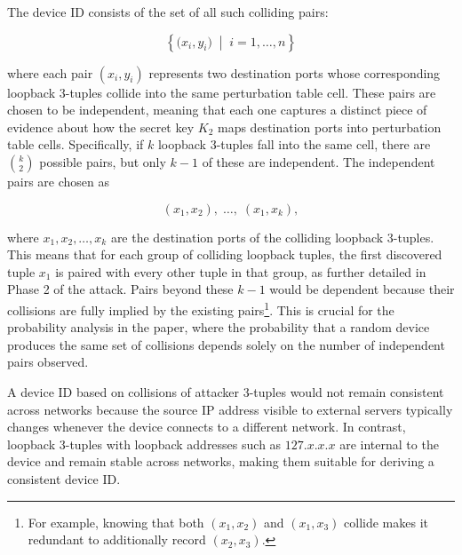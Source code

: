 \documentclass{report}
\begin{document}
The device ID consists of the set of all such colliding pairs:

\[
	\left\{ \bigl(x_i, y_i\bigr) \;\middle|\; i = 1, \ldots, n \right\}
\]

where each pair $(x_i, y_i)$ represents \alert{two destination ports} whose corresponding loopback 3-tuples collide into the same perturbation table cell. These pairs are chosen to be \alert{independent}, meaning that each one captures a distinct piece of evidence about how the secret key $K_2$ maps destination ports into perturbation table cells. Specifically, if $k$ loopback 3-tuples fall into the same cell, there are $\binom{k}{2}$ possible pairs, but only $k-1$ of these are independent. The independent pairs are chosen as

\[
	(x_1, x_2),\; \ldots,\; (x_1, x_k),
\]

where $x_1, x_2, \ldots, x_k$ are the destination ports of the colliding loopback 3-tuples. This means that for each group of colliding loopback tuples, the first discovered tuple $x_1$ is paired with every other tuple in that group, as further detailed in Phase 2 of the attack. Pairs beyond these $k-1$ would be \alert{dependent} because their collisions are fully implied by the existing pairs\footnote{For example, knowing that both $(x_1, x_2)$ and $(x_1, x_3)$ collide makes it redundant to additionally record $(x_2, x_3)$.}. This is crucial for the probability analysis in the paper, where the probability that a random device produces the same set of collisions depends solely on the number of independent pairs observed.

A device ID based on collisions of \alert{attacker 3-tuples} would not remain consistent across networks because the source IP address visible to external servers typically changes whenever the device connects to a different network. In contrast, \alert{loopback 3-tuples} with loopback addresses such as $127.x.x.x$ are internal to the device and remain stable across networks, making them suitable for deriving a consistent device ID.

\end{document}
